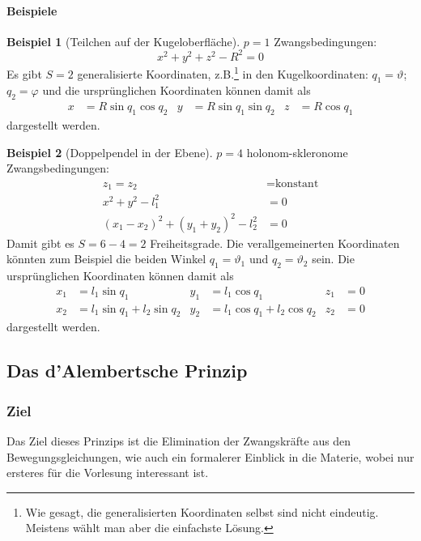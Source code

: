 \documentclass[oneside]{book}
\theoremstyle{definition}
\newtheorem*{beispiel*}{Beispiel}
\begin{document}
\paragraph{Beispiele}

\begin{beispiel*}[Teilchen auf der Kugeloberfläche]
$p = 1$ Zwangsbedingungen:
$$x^2 + y^2 + z^2 - R^2 = 0$$
Es gibt $S = 2$ generalisierte Koordinaten, z.B.\footnote{Wie gesagt, die generalisierten Koordinaten selbst sind nicht eindeutig. Meistens wählt man aber die einfachste Lösung.} in den Kugelkoordinaten: $q_1 = \vartheta$; $q_2 = \varphi$ und die ursprünglichen Koordinaten können damit als 
\begin{align*}
x &= R \sin{q_1} \cos{q_2} & y &= R \sin q_1 \sin q_2 & z &= R \cos q_1
\end{align*}
dargestellt werden.
\end{beispiel*}

\begin{beispiel*}[Doppelpendel in der Ebene] $p = 4$ holonom-skleronome Zwangsbedingungen:
\begin{align*}
	z_1 = z_2 &= \text{konstant}\\
	x^2 + y^2 - l^2_1 &= 0\\
	(x_1 - x_2)^2 + (y_1 + y_2)^2 - l_2^2 &= 0 
\end{align*}
Damit gibt es $S = 6 - 4= 2$ Freiheitsgrade. Die verallgemeinerten Koordinaten könnten zum Beispiel die beiden Winkel $q_1 = \vartheta_1$ und $q_2 = \vartheta_2$ sein. Die ursprünglichen Koordinaten können damit als 
\begin{align*}
x_1 &= l_1 \sin q_1 & y_1 &= l_1 \cos q_1 & z_1 &= 0\\
x_2 &= l_1 \sin q_1 + l_2 \sin q_2 & y_2 &= l_1 \cos q_1 + l_2 \cos q_2 & z_2 &= 0
\end{align*}
dargestellt werden.
\end{beispiel*}


\subsection{Das d'Alembertsche Prinzip}

\subsubsection{Ziel} Das Ziel dieses Prinzips ist die Elimination der Zwangskräfte aus den Bewegungsgleichungen, wie auch ein formalerer Einblick in die Materie, wobei nur ersteres für die Vorlesung interessant ist.
\end{document}
